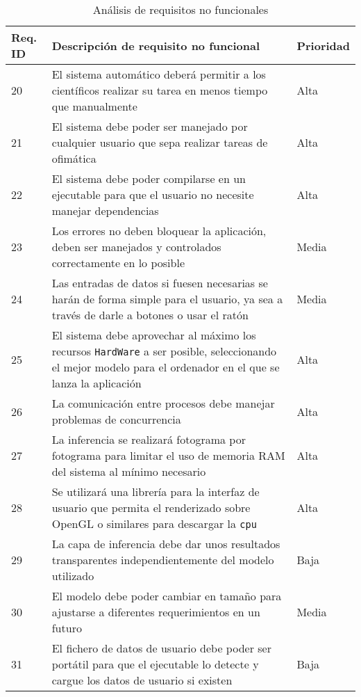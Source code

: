 \begin{table}[H]
    \begin{center}
        \begin{tabular}{p{} | p{} p{}}
            Req. ID & Descripción de requisito no funcional & Prioridad\\
            \hline
            20& El sistema automático deberá permitir a los científicos realizar su tarea en menos tiempo que manualmente & Alta\\
            \hline
            21& El sistema debe poder ser manejado por cualquier usuario que sepa realizar tareas de ofimática & Alta\\
            \hline
            22& El sistema debe poder compilarse en un ejecutable para que el usuario no necesite manejar dependencias  & Alta\\
            \hline
            23& Los errores no deben bloquear la aplicación, deben ser manejados y controlados correctamente en lo posible & Media\\
            \hline
            24& Las entradas de datos si fuesen necesarias se harán de forma simple para el usuario, ya sea a través de darle a botones o usar el ratón & Media\\
            \hline
            25& El sistema debe aprovechar al máximo los recursos \texttt{HardWare} a ser posible, seleccionando el mejor modelo para el ordenador en el que se lanza la aplicación & Alta\\
            \hline
            26& La comunicación entre procesos debe manejar problemas de concurrencia & Alta\\
            \hline
            27& La inferencia se realizará fotograma por fotograma para limitar el uso de memoria RAM del sistema al mínimo necesario & Alta\\
            \hline
            28& Se utilizará una librería para la interfaz de usuario que permita el renderizado sobre OpenGL o similares para descargar la \texttt{\acrshort{cpu}} & Alta\\
            \hline
            29& La capa de inferencia debe dar unos resultados transparentes independientemente del modelo utilizado & Baja\\
            \hline
            30& El modelo debe poder cambiar en tamaño para ajustarse a diferentes requerimientos en un futuro & Media\\
            \hline
            31& El fichero de datos de usuario debe poder ser portátil para que el ejecutable lo detecte y cargue los datos de usuario si existen & Baja\\
            \hline
        \end{tabular} 
    \end{center}
    \caption{Análisis de requisitos no funcionales}
    \label{ReqNoFuncionales}
\end{table}

